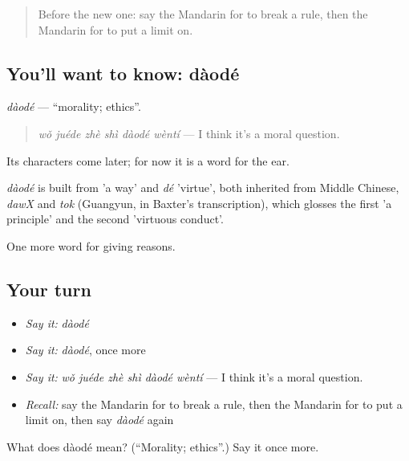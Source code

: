 \label{lesson:ZH-C359-daode}



\begin{quote}
Before the new one: say the Mandarin for to break a rule, then the Mandarin for to put a limit on.
\end{quote}

\subsection*{You'll want to know: dàodé}
\emph{dàodé} — \textquotedblleft{}morality; ethics\textquotedblright{}.

\begin{quote}
\emph{wǒ juéde zhè shì dàodé wèntí} — I think it's a moral question.
\end{quote}

Its characters come later; for now it is a word for the ear.

\begin{cousinweb}
\emph{dàodé} is built from  'a way' and \emph{dé} 'virtue', both inherited from Middle Chinese, \emph{dawX} and \emph{tok} (Guangyun, in Baxter's transcription), which glosses the first 'a principle' and the second 'virtuous conduct'.
\end{cousinweb}

\begin{grammarlens}[title={What you've built}]
One more word for giving reasons.
\end{grammarlens}

\subsection*{Your turn}
\begin{itemize}
\raggedright
  \item \emph{Say it:} \emph{dàodé}
  \item \emph{Say it:} \emph{dàodé}, once more
  \item \emph{Say it:} \emph{wǒ juéde zhè shì dàodé wèntí} — I think it's a moral question.
  \item \emph{Recall:} say the Mandarin for to break a rule, then the Mandarin for to put a limit on, then say \emph{dàodé} again
\end{itemize}

\begin{tcolorbox}[breakable,colback=teal!4,colframe=teal!35!black,title={Before you move on}]
What does dàodé mean? (\textquotedblleft{}Morality; ethics\textquotedblright{}.) Say it once more.
\end{tcolorbox}
